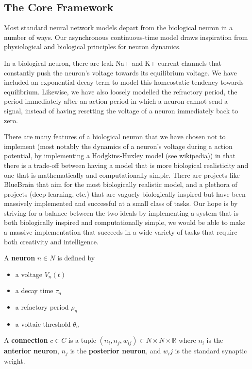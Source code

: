 \subsection{The Core Framework}


Most standard neural network models depart from the biological neuron in a number of ways. Our asynchronous continuous-time model draws inspiration from physiological and biological principles for neuron dynamics.

In a biological neuron, there are leak Na+ and K+ current channels that constantly push the neuron's voltage towards its equilibrium voltage. We have included an exponential decay term to model this homeostatic tendency towards equilibrium. Likewise, we have also loosely modelled the refractory period, the period immediately after an action period in which a neuron cannot send a signal, instead of having resetting the voltage of a neuron immediately back to zero.

There are many features of a biological neuron that we have chosen not to implement (most notably the dynamics of a neuron's voltage during a action potential, by implementing a Hodgkins-Huxley model (see wikipedia)) in that there is a trade-off between having a model that is more biological realisticity and one that is mathematically and computationally simple. There are projects like BlueBrain that aim for the most biologically realistic model, and a plethora of projects (deep learning, etc.) that are vaguely biologically inspired but have been massively implemented and successful at a small class of tasks. Our hope is by striving for a balance between the two ideals by implementing a system that is both biologically inspired and computationally simple, we would be able to make a massive implementation that succeeds in a wide variety of tasks that require both creativity and intelligence.


\begin{definition}\label{neuron}
	A \textbf{neuron} $n \in N$ is defined by
	\begin{itemize}
		\item a voltage $V_n(t)$
		\item a decay time $\tau_n$
		\item a refactory period $\rho_n$
		\item a voltaic threshold $\theta_n$
	\end{itemize}
\end{definition}
\begin{definition}\label{connection}
	A \textbf{connection} $c \in C$ is a tuple $(n_i, n_j, w_{ij}) \in N \times N \times \mathbb{R}$
	where $n_i$ is  the \textbf{anterior neuron}, $n_j$ is the \textbf{posterior neuron}, and $w_ij$
	is the standard synaptic weight.
\end{definition}

